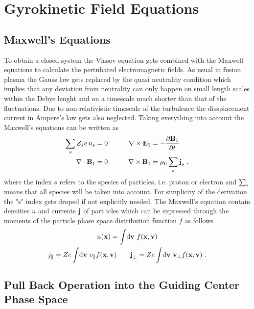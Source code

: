 \newpage
\section{Gyrokinetic Field Equations}
\label{sec:fields}

\subsection{Maxwell's Equations}
\label{sub:maxwellEquations}

To obtain a closed system the Vlasov equation gets combined with the Maxwell equations to calculate the pertubated electromagnetic fields. As usual in fusion plasma the Gauss law gets replaced by the quasi neutrality condition which implies that any deviation from neutrality can only happen on small length scales within the Debye lenght and on a timescale much shorter than that of the fluctuations. Due to non-relativistic timescale of the turbulence the dissplacement current in Ampere's law gets also neglected. Taking everything into account the Maxwell's equations can be written as
\begin{gather}
	\begin{aligned}
		\sum_s Z_s e \, n_s &= 0  &\qquad \nabla \times \boldsymbol{\mathbf{E}}_1 &= - \frac{\partial \boldsymbol{\mathbf{B}}_1}{\partial t}\\
		\nabla \cdot \boldsymbol{\mathbf{B}}_1 &= 0 &\qquad \nabla \times \boldsymbol{\mathbf{B}}_1 &= \mu_0 \sum_s \boldsymbol{\mathbf{j}}_s~,
	\end{aligned}
	\label{eq:maxwellEquations}
\end{gather}
where the index $s$ refers to the species of particles, i.e. proton or electron and $\sum_s$ means that all species will be taken into account. For simplicity of the derivation the "s" index gets droped if not explicitly needed. The Maxwell's equation contain densities $n$ and currents $\boldsymbol{\mathbf{j}}$ of part icles which can be expressed through the moments of the particle phase space distribution function $f$ as follows
\begin{gather}
	n(\boldsymbol{\mathbf{x}}) = \int \! \mathrm{d}\boldsymbol{\mathbf{v}} ~ f(\boldsymbol{\mathbf{x}}, \boldsymbol{\mathbf{v}}) \\
	j_\parallel = Ze \int \! \mathrm{d}\boldsymbol{\mathbf{v}} ~ v_\parallel f(\boldsymbol{\mathbf{x}}, \boldsymbol{\mathbf{v}}) \qquad \boldsymbol{\mathbf{j}}_\perp = Ze \int \! \mathrm{d}\boldsymbol{\mathbf{v}} ~ \boldsymbol{\mathbf{v}}_\perp f(\boldsymbol{\mathbf{x}}, \boldsymbol{\mathbf{v}})~.
	\label{eq:momentsParticleSpace}
\end{gather}
\newpage

\subsection{Pull Back Operation into the Guiding Center Phase Space}
\label{sub:pullback}

